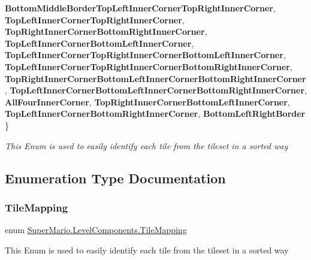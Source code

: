 \begin{DoxyCompactItemize}
\newline
{\bfseries Bottom\+Middle\+Border\+Top\+Left\+Inner\+Corner\+Top\+Right\+Inner\+Corner}, 
{\bfseries Top\+Left\+Inner\+Corner\+Top\+Right\+Inner\+Corner}, 
{\bfseries Top\+Right\+Inner\+Corner\+Bottom\+Right\+Inner\+Corner}, 
{\bfseries Top\+Left\+Inner\+Corner\+Bottom\+Left\+Inner\+Corner}, 
\newline
{\bfseries Top\+Left\+Inner\+Corner\+Top\+Right\+Inner\+Corner\+Bottom\+Left\+Inner\+Corner}, 
{\bfseries Top\+Left\+Inner\+Corner\+Top\+Right\+Inner\+Corner\+Bottom\+Right\+Inner\+Corner}, 
{\bfseries Top\+Right\+Inner\+Corner\+Bottom\+Left\+Inner\+Corner\+Bottom\+Right\+Inner\+Corner}, 
{\bfseries Top\+Left\+Inner\+Corner\+Bottom\+Left\+Inner\+Corner\+Bottom\+Right\+Inner\+Corner}, 
\newline
{\bfseries All\+Four\+Inner\+Corner}, 
{\bfseries Top\+Right\+Inner\+Corner\+Bottom\+Left\+Inner\+Corner}, 
{\bfseries Top\+Left\+Inner\+Corner\+Bottom\+Right\+Inner\+Corner}, 
{\bfseries Bottom\+Left\+Right\+Border}
 \}
\begin{DoxyCompactList}\small\item\em This Enum is used to easily identify each tile from the tileset in a sorted way \end{DoxyCompactList}\end{DoxyCompactItemize}


\subsection{Enumeration Type Documentation}
\mbox{\label{namespace_super_mario_1_1_level_components_a6fb13645a44790821090630fdf2b1afd}} 
\subsubsection{\texorpdfstring{Tile\+Mapping}{TileMapping}}
{\footnotesize\ttfamily enum \mbox{\hyperlink{namespace_super_mario_1_1_level_components_a6fb13645a44790821090630fdf2b1afd}{Super\+Mario.\+Level\+Components.\+Tile\+Mapping}}\hspace{0.3cm}{\ttfamily [strong]}}



This Enum is used to easily identify each tile from the tileset in a sorted way 


